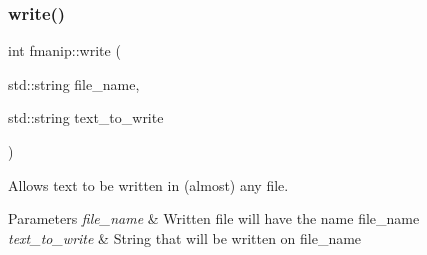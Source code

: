 \subsubsection{\texorpdfstring{write()}{write()}}
{\footnotesize\ttfamily int fmanip\+::write (\begin{DoxyParamCaption}\item[{std\+::string}]{file\+\_\+name,  }\item[{std\+::string}]{text\+\_\+to\+\_\+write }\end{DoxyParamCaption})}

Allows text to be written in (almost) any file. 
\begin{DoxyParams}{Parameters}
{\em file\+\_\+name} & Written file will have the name file\+\_\+name \\
\hline
{\em text\+\_\+to\+\_\+write} & String that will be written on file\+\_\+name \\
\hline
\end{DoxyParams}
